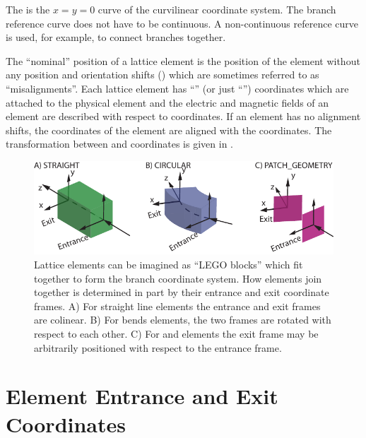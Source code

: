 The  is the $x = y = 0$ curve of the curvilinear coordinate
system. The branch reference curve does not have to be continuous. A non-continuous
reference curve is used, for example, to connect branches together. 

The ``nominal'' position of a lattice element is the position of the element without any
position and orientation shifts () 
which are sometimes referred to as ``misalignments''. 
Each lattice element has ``'' (or just ``'') 
coordinates which are attached to the physical element and the electric and magnetic
fields of an element are described with respect to  coordinates.  
If an element has no
alignment shifts, the  coordinates of the element are aligned with the 
 coordinates.
The transformation between  and  coordinates is given in
.


  \begin{figure}[tb]
  \centering
  \includegraphics[width=5in]{ele-coord-frame.pdf}
\caption[Lattice elements as LEGO blocks.]{Lattice elements can be imagined as ``LEGO blocks'' which
fit together to form the branch coordinate system. How elements
join together is determined in part by their entrance and exit coordinate frames. A) For
straight line elements the entrance and exit frames are colinear. B) For bends elements, the two
frames are rotated with respect to each other. C) For  and  elements the
exit frame may be arbitrarily positioned with respect to the entrance frame.}
  \label{f:ele.coord.frame}
  \end{figure}


\section{Element Entrance and Exit Coordinates}
\label{s:ent.exi}

